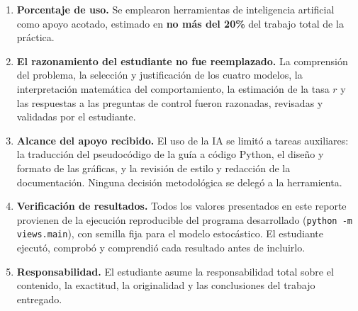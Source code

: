 \documentclass[11pt,a4paper]{article}
\begin{document}
\begin{enumerate}[leftmargin=*]
  \item \textbf{Porcentaje de uso.} Se emplearon herramientas de inteligencia artificial
        como apoyo acotado, estimado en \textbf{no m\'as del 20\%} del trabajo total de
        la pr\'actica.

  \item \textbf{El razonamiento del estudiante no fue reemplazado.} La comprensi\'on del
        problema, la selecci\'on y justificaci\'on de los cuatro modelos, la
        interpretaci\'on matem\'atica del comportamiento, la estimaci\'on de la tasa $r$ y
        las respuestas a las preguntas de control fueron razonadas, revisadas y validadas
        por el estudiante.

  \item \textbf{Alcance del apoyo recibido.} El uso de la IA se limit\'o a tareas
        auxiliares: la traducci\'on del pseudoc\'odigo de la gu\'ia a c\'odigo Python, el
        diseño y formato de las gr\'aficas, y la revisi\'on de estilo y redacci\'on de la
        documentaci\'on. Ninguna decisi\'on metodol\'ogica se deleg\'o a la herramienta.

  \item \textbf{Verificaci\'on de resultados.} Todos los valores presentados en este
        reporte provienen de la ejecuci\'on reproducible del programa desarrollado
        (\texttt{python -m views.main}), con semilla fija para el modelo estoc\'astico. El
        estudiante ejecut\'o, comprob\'o y comprendi\'o cada resultado antes de incluirlo.

  \item \textbf{Responsabilidad.} El estudiante asume la responsabilidad total sobre el
        contenido, la exactitud, la originalidad y las conclusiones del trabajo entregado.
\end{enumerate}



\end{document}
